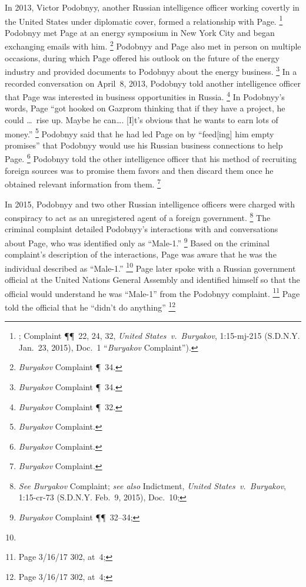 In 2013, Victor Podobnyy, another Russian intelligence officer working covertly in the United States under diplomatic cover, formed a relationship with Page.%
\footnote{; Complaint \P\P~22, 24, 32, \textit{United States~v.\ Buryakov}, 1:15-mj-215 (S.D.N.Y. Jan.~23, 2015), Doc.~1 ``\textit{Buryakov} Complaint'').}
Podobnyy met Page at an energy symposium in New York City and began exchanging emails with him.%
\footnote{\textit{Buryakov} Complaint \P~34.}
Podobnyy and Page also met in person on multiple occasions, during which Page offered his outlook on the future of the energy industry and provided documents to Podobnyy about the energy business.%
\footnote{\textit{Buryakov} Complaint \P~34.}
In a recorded conversation on April~8, 2013, Podobnyy told another intelligence officer that Page was interested in business opportunities in Russia.%
\footnote{\textit{Buryakov} Complaint \P~32.}
In Podobnyy's words, Page ``got hooked on Gazprom thinking that if they have a project, he could \dots\ rise up. Maybe he can\dots. [I]t's obvious that he wants to earn lots of money.''%
\footnote{\textit{Buryakov} Complaint.}
Podobnyy said that he had led Page on by ``feed[ing] him empty promises'' that Podobnyy would use his Russian business connections to help Page.%
\footnote{\textit{Buryakov} Complaint.}
Podobnyy told the other intelligence officer that his method of recruiting foreign sources was to promise them favors and then discard them once he obtained relevant information from them.%
\footnote{\textit{Buryakov} Complaint.}

In 2015, Podobnyy and two other Russian intelligence officers were charged with conspiracy to act as an unregistered agent of a foreign government.%
\footnote{\textit{See Buryakov} Complaint;
\textit{see also} Indictment, \textit{United States~v.\ Buryakov}, 1:15-cr-73 (S.D.N.Y. Feb.~9, 2015), Doc.~10;
}
The criminal complaint detailed Podobnyy's interactions with and conversations about Page, who was identified only as ``\hbox{Male-1}.''%
\footnote{\textit{Buryakov} Complaint \P\P~32--34; }
Based on the criminal complaint's description of the interactions, Page was aware that he was the individual described as ``\hbox{Male-1}.''%
\footnote{}
Page later spoke with a Russian government official at the United Nations General Assembly and identified himself so that the official would understand he was ``\hbox{Male-1}'' from the Podobnyy complaint. %
\footnote{Page 3/16/17 302, at~4; }
Page told the official that he ``didn't do anything''
\footnote{Page 3/16/17 302, at~4; }

